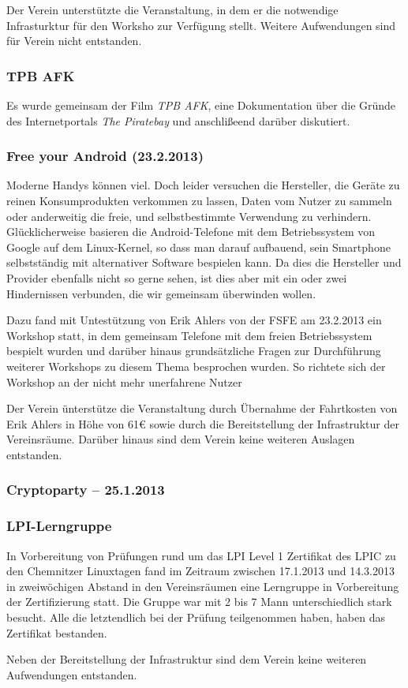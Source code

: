 \documentclass[10pt,DIV16]{scrartcl}
\begin{document}
Der Verein unterstützte die Veranstaltung, in dem er die notwendige
Infrasturktur für den Worksho zur Verfügung stellt. Weitere
Aufwendungen sind für Verein nicht entstanden.

\subsubsection{TPB AFK}

Es wurde gemeinsam der Film \textit{TPB AFK}, eine Dokumentation
über die Gründe des Internetportals \textit {The Piratebay} und
anschlißeend darüber diskutiert.

\subsubsection{Free your Android (23.2.2013)}

Moderne Handys können viel. Doch leider versuchen die Hersteller,
die Geräte zu reinen Konsumprodukten verkommen zu lassen, Daten vom
Nutzer zu sammeln oder anderweitig die freie, und selbstbestimmte
Verwendung zu verhindern. Glücklicherweise basieren die
Android-Telefone mit dem Betriebssystem von Google auf dem
Linux-Kernel, so dass man darauf aufbauend, sein Smartphone
selbstständig mit alternativer Software bespielen kann. Da dies die
Hersteller und Provider ebenfalls nicht so gerne sehen, ist dies
aber mit ein oder zwei Hindernissen verbunden, die wir gemeinsam
überwinden wollen.

Dazu fand mit Untestützung von Erik Ahlers von der FSFE am 23.2.2013
ein Workshop statt, in dem gemeinsam Telefone mit dem freien
Betriebssystem bespielt wurden und darüber hinaus grundsätzliche
Fragen zur Durchführung weiterer Workshops zu diesem Thema
besprochen wurden. So richtete sich der Workshop an der nicht mehr
unerfahrene Nutzer

Der Verein ünterstütze die Veranstaltung durch Übernahme der
Fahrtkosten von Erik Ahlers in Höhe von 61\euro{} sowie durch die
Bereitstellung der Infrastruktur der Vereinsräume. Darüber hinaus
sind dem Verein keine weiteren Auslagen entstanden.

\subsubsection{Cryptoparty -- 25.1.2013}

\subsubsection{LPI-Lerngruppe}

In Vorbereitung von Prüfungen rund um das LPI Level 1 Zertifikat des
LPIC zu den Chemnitzer Linuxtagen fand im Zeitraum zwischen
17.1.2013 und 14.3.2013 in zweiwöchigen Abstand in den Vereinsräumen
eine Lerngruppe in Vorbereitung der Zertifizierung statt. Die Gruppe
war mit 2 bis 7 Mann unterschiedlich stark besucht. Alle die
letztendlich bei der Prüfung teilgenommen haben, haben das
Zertifikat bestanden.

Neben der Bereitstellung der Infrastruktur sind dem Verein keine
weiteren Aufwendungen entstanden.
\end{document}
